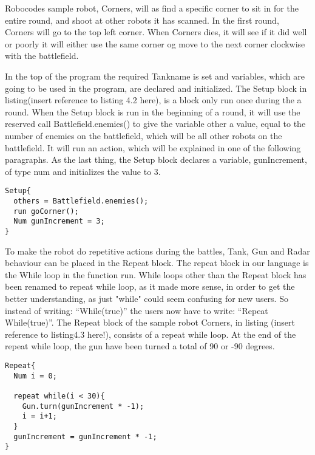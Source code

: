 Robocodes sample robot, Corners, will as find a specific corner to sit in for the entire round, and shoot at other robots it has scanned. In the first round, Corners will go to the top left corner. When Corners dies, it will see if it did well or poorly it will either use the same corner og move to the next corner clockwise with the battlefield.

In the top of the program the required Tankname is set and variables, which are going to be used in the program, are declared and initialized. The Setup block in listing(insert reference to listing 4.2 here), is a block only run once during the a round. When the Setup block is run in the beginning of a round, it will use the reserved call Battlefield.enemies() to give the variable other a value, equal to the number of enemies on the battlefield, which will be all other robots on the battlefield. It will run an action, which will be explained in one of the following paragraphs. As the last thing, the Setup block declares a variable, gunIncrement, of type num and initializes the value to 3.

\begin{lstlisting}[caption={Code listing of the Setup block} label=corners1, xleftmargin=.2\textwidth]
Setup{
  others = Battlefield.enemies();  
  run goCorner();	 
  Num gunIncrement = 3;
}
\end{lstlisting}

To make the robot do repetitive actions during the battles, Tank, Gun and Radar behaviour can be placed in the Repeat block. The repeat block in our language is the While loop in the function run. While loops other than the Repeat block has been renamed to repeat while loop, as it made more sense, in order to get the better understanding, as just "while" could seem confusing for new users. So instead of writing: “While(true)” the users now have to write: “Repeat While(true)”. The Repeat block of the sample robot Corners, in listing (insert reference to listing4.3 here!), consists of a repeat while loop. At the end of the repeat while loop, the gun have been turned a total of 90 or -90 degrees. 

\begin{lstlisting}[caption={Code listing of the Repeat block} label=corners2, xleftmargin=.2\textwidth]
Repeat{  
  Num i = 0;
  
  repeat while(i < 30){
    Gun.turn(gunIncrement * -1);
    i = i+1;
  }  
  gunIncrement = gunIncrement * -1;
}
\end{lstlisting}

